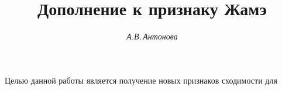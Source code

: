




% 





\newcommand{\tts}[1]{}


\renewcommand{\baselinestretch}{0.98}







\setcounter{page}{3}















\author{\it А.В.\,Антонова}




\title{Дополнение к признаку Жамэ}





\date{}




\pagestyle{plain} %







\maketitle


\label{begin}








Целью данной работы является получение новых признаков сходимости  для


